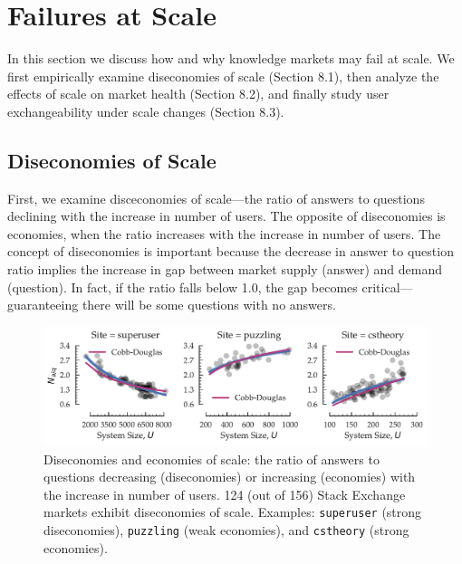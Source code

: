\section{Failures at Scale}
In this section we discuss how and why knowledge markets may fail at scale. We first empirically examine diseconomies of scale (Section 8.1), then analyze the effects of scale on market health (Section 8.2), and finally study user exchangeability under scale changes (Section 8.3).

\subsection{Diseconomies of Scale}
First, we examine disceconomies of scale---the ratio of answers to questions declining with the increase in number of users. The opposite of diseconomies is economies, when the ratio increases with the increase in number of users. The concept of diseconomies is important because the decrease in answer to question ratio implies the increase in gap between market supply (answer) and demand (question). In fact, if the ratio falls below 1.0, the gap becomes critical---guaranteeing there will be some questions with no answers. 

\begin{figure}[hbt]
\vspace{-0.5\baselineskip}
\centering
\includegraphics[scale=0.39]{Figures/Size_vs_Diseconomy.pdf}
\vspace{-2\baselineskip}
\caption{Diseconomies and economies of scale: the ratio of answers to questions decreasing (diseconomies) or increasing (economies) with the increase in number of users. 124 (out of 156) Stack Exchange markets exhibit diseconomies of scale. Examples: \texttt{superuser} (strong diseconomies), \texttt{puzzling} (weak economies), and \texttt{cstheory} (strong economies). }
\vspace{-\baselineskip}
\label{fig:diseconomy}
\end{figure}

